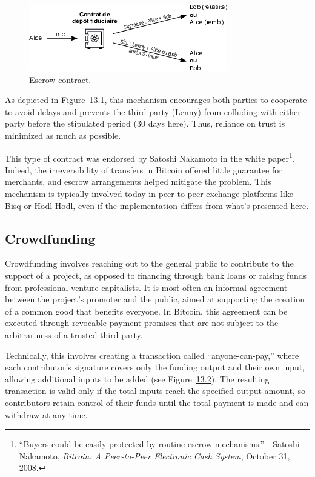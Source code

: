 \documentclass[
  a5paper,
  smalldemyvopaper,10pt,twoside,onecolumn,openright,extrafontsizes,hidelinks]{memoir}
\begin{document}
\begin{figure}

{\centering \includegraphics{chapters/img/escrow-contract.png}

}

\caption{Escrow contract.}

\end{figure}%

As depicted in Figure~\hyperref[fig:escrow-contract]{13.1}, this
mechanism encourages both parties to cooperate to avoid delays and
prevents the third party (Lenny) from colluding with either party before
the stipulated period (30 days here). Thus, reliance on trust is
minimized as much as possible.

This type of contract was endorsed by Satoshi Nakamoto in the white
paper\footnote{``Buyers could be easily protected by routine escrow
  mechanisms.''---Satoshi Nakamoto, \emph{Bitcoin: A Peer-to-Peer
  Electronic Cash System}, October 31, 2008.}. Indeed, the
irreversibility of transfers in Bitcoin offered little guarantee for
merchants, and escrow arrangements helped mitigate the problem. This
mechanism is typically involved today in peer-to-peer exchange platforms
like Bisq or Hodl Hodl, even if the implementation differs from what's
presented here.

\subsection{Crowdfunding}\label{crowdfunding}

Crowdfunding involves reaching out to the general public to contribute
to the support of a project, as opposed to financing through bank loans
or raising funds from professional venture capitalists. It is most often
an informal agreement between the project's promoter and the public,
aimed at supporting the creation of a common good that benefits
everyone. In Bitcoin, this agreement can be executed through revocable
payment promises that are not subject to the arbitrariness of a trusted
third party.

Technically, this involves creating a transaction called
``anyone-can-pay,'' where each contributor's signature covers only the
funding output and their own input, allowing additional inputs to be
added (see Figure~\hyperref[fig:sighash-anyonecanpay]{13.2}). The
resulting transaction is valid only if the total inputs reach the
specified output amount, so contributors retain control of their funds
until the total payment is made and can withdraw at any time.
\end{document}
